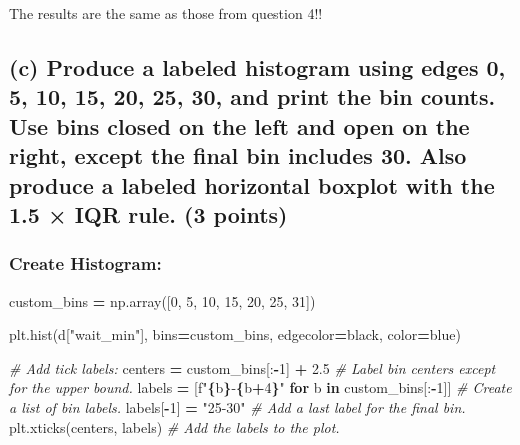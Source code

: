 \documentclass[
]{article}
\newenvironment{Shaded}{\begin{snugshade}}{\end{snugshade}}
\newcommand{\CommentTok}[1]{\textcolor[rgb]{0.56,0.35,0.01}{\textit{#1}}}
\newcommand{\ControlFlowTok}[1]{\textcolor[rgb]{0.13,0.29,0.53}{\textbf{#1}}}
\newcommand{\DecValTok}[1]{\textcolor[rgb]{0.00,0.00,0.81}{#1}}
\newcommand{\FloatTok}[1]{\textcolor[rgb]{0.00,0.00,0.81}{#1}}
\newcommand{\KeywordTok}[1]{\textcolor[rgb]{0.13,0.29,0.53}{\textbf{#1}}}
\newcommand{\NormalTok}[1]{#1}
\newcommand{\OperatorTok}[1]{\textcolor[rgb]{0.81,0.36,0.00}{\textbf{#1}}}
\newcommand{\SpecialCharTok}[1]{\textcolor[rgb]{0.81,0.36,0.00}{\textbf{#1}}}
\newcommand{\SpecialStringTok}[1]{\textcolor[rgb]{0.31,0.60,0.02}{#1}}
\newcommand{\StringTok}[1]{\textcolor[rgb]{0.31,0.60,0.02}{#1}}
\begin{document}
The results are the same as those from question 4!!

\subsection{(c) Produce a labeled histogram using edges 0, 5, 10, 15,
20, 25, 30, and print the bin counts. Use bins closed on the left and
open on the right, except the final bin includes 30. Also produce a
labeled horizontal boxplot with the 1.5 × IQR rule. (3
points)}\label{c-produce-a-labeled-histogram-using-edges-0-5-10-15-20-25-30-and-print-the-bin-counts.-use-bins-closed-on-the-left-and-open-on-the-right-except-the-final-bin-includes-30.-also-produce-a-labeled-horizontal-boxplot-with-the-1.5-iqr-rule.-3-points}

\subsubsection{Create Histogram:}\label{create-histogram}

\begin{Shaded}
\begin{Highlighting}[]
\NormalTok{custom\_bins }\OperatorTok{=}\NormalTok{ np.array([}\DecValTok{0}\NormalTok{, }\DecValTok{5}\NormalTok{, }\DecValTok{10}\NormalTok{, }\DecValTok{15}\NormalTok{, }\DecValTok{20}\NormalTok{, }\DecValTok{25}\NormalTok{, }\DecValTok{31}\NormalTok{])}

\NormalTok{plt.hist(d[}\StringTok{"wait\_min"}\NormalTok{], bins}\OperatorTok{=}\NormalTok{custom\_bins, edgecolor}\OperatorTok{=}\StringTok{\textquotesingle{}black\textquotesingle{}}\NormalTok{, color}\OperatorTok{=}\StringTok{\textquotesingle{}blue\textquotesingle{}}\NormalTok{)}

\CommentTok{\# Add tick labels:}
\NormalTok{centers }\OperatorTok{=}\NormalTok{ custom\_bins[:}\OperatorTok{{-}}\DecValTok{1}\NormalTok{] }\OperatorTok{+} \FloatTok{2.5} \CommentTok{\# Label bin centers except for the upper bound.}
\NormalTok{labels }\OperatorTok{=}\NormalTok{ [}\SpecialStringTok{f"}\SpecialCharTok{\{}\NormalTok{b}\SpecialCharTok{\}}\SpecialStringTok{{-}}\SpecialCharTok{\{}\NormalTok{b}\OperatorTok{+}\DecValTok{4}\SpecialCharTok{\}}\SpecialStringTok{"} \ControlFlowTok{for}\NormalTok{ b }\KeywordTok{in}\NormalTok{ custom\_bins[:}\OperatorTok{{-}}\DecValTok{1}\NormalTok{]] }\CommentTok{\# Create a list of bin labels.}
\NormalTok{labels[}\OperatorTok{{-}}\DecValTok{1}\NormalTok{] }\OperatorTok{=} \StringTok{"25{-}30"} \CommentTok{\# Add a last label for the final bin.}
\NormalTok{plt.xticks(centers, labels) }\CommentTok{\# Add the labels to the plot.}
\end{Highlighting}
\end{Shaded}
\end{document}
